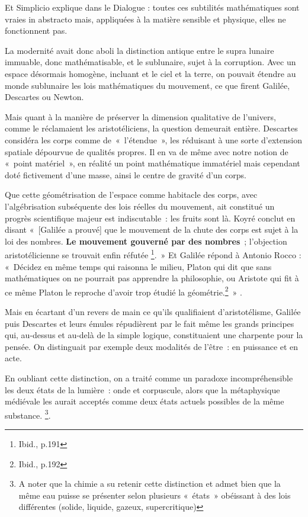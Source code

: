 \documentclass[a4paper,12pt]{article}
\begin{document}
Et Simplicio explique dans le Dialogue : toutes ces subtilités mathématiques sont vraies in abstracto mais, appliquées à la matière sensible et physique, elles ne fonctionnent pas.

La modernité avait donc aboli la distinction antique entre le supra lunaire immuable, donc mathématisable, et le sublunaire, sujet à la corruption. Avec un espace désormais homogène, incluant et le ciel et la terre, on pouvait étendre au monde sublunaire les lois mathématiques du mouvement, ce que firent Galilée, Descartes ou Newton.

Mais quant à la manière de préserver la dimension qualitative de l'univers, comme le réclamaient les aristotéliciens, la question demeurait entière. Descartes considéra les corps comme de « l'étendue », les réduisant à une sorte d'extension spatiale dépourvue de qualités propres. Il en va de même avec notre notion de « point matériel », en réalité un point mathématique immatériel mais cependant doté fictivement d'une masse, ainsi le centre de gravité d’un corps. 

Que cette géométrisation de l'espace comme habitacle des corps, avec l'algébrisation subséquente des lois réelles du mouvement, ait constitué un progrès scientifique majeur est indiscutable : les fruits sont là. Koyré conclut en disant « [Galilée a prouvé] que le mouvement de la chute des corps est sujet à la loi des nombres. \textbf{Le mouvement gouverné par des nombres} ; l'objection aristotélicienne se trouvait enfin réfutée \footnote{Ibid., p.191}. » Et Galilée répond à Antonio Rocco : « Décidez en même temps qui raisonna le milieu, Platon qui dit que sans mathématiques on ne pourrait pas apprendre la philosophie, ou Aristote qui fit à ce même Platon le reproche d'avoir trop étudié la géométrie.\footnote{Ibid., p.192} » .

Mais en écartant d'un revers de main ce qu'ils qualifiaient d’aristotélisme, Galilée puis Descartes et leurs émules répudièrent par le fait même les grands principes qui, au-dessus et au-delà de la simple logique, constituaient une charpente pour la pensée. On distinguait par exemple deux modalités de l’être : en puissance et en acte. 

En oubliant cette distinction, on a traité comme un paradoxe incompréhensible les deux états de la lumière : onde et corpuscule, alors que la métaphysique médiévale les aurait acceptés comme deux états actuels possibles de la même substance. \footnote{A noter que la chimie a su retenir cette distinction et admet bien que la même eau puisse se présenter selon plusieurs « états » obéissant à des lois différentes (solide, liquide, gazeux, supercritique)}. 
\end{document}
